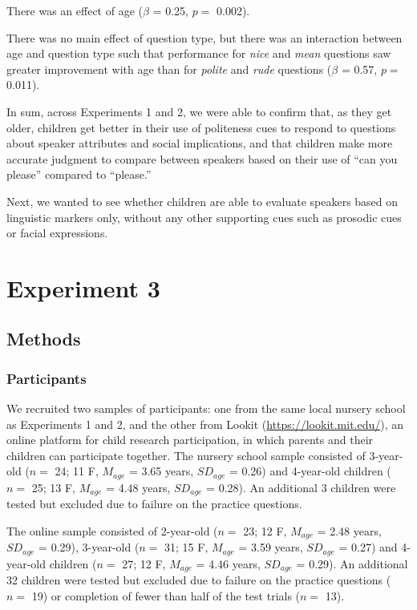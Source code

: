 \documentclass[10pt, letterpaper]{article}
\begin{document}
There was an effect of age (\(\beta\) = 0.25, \(p =\) 0.002).

There was no main effect of question type, but there was an interaction
between age and question type such that performance for \emph{nice} and
\emph{mean} questions saw greater improvement with age than for
\emph{polite} and \emph{rude} questions (\(\beta\) = 0.57, \(p =\)
0.011).

In sum, across Experiments 1 and 2, we were able to confirm that, as
they get older, children get better in their use of politeness cues to
respond to questions about speaker attributes and social implications,
and that children make more accurate judgment to compare between
speakers based on their use of ``can you please'' compared to
``please.''

Next, we wanted to see whether children are able to evaluate speakers
based on linguistic markers only, without any other supporting cues such
as prosodic cues or facial expressions.

\section{Experiment 3}\label{experiment-3}

\subsection{Methods}\label{methods-2}

\subsubsection{Participants}\label{participants-2}

We recruited two samples of participants: one from the same local
nursery school as Experiments 1 and 2, and the other from Lookit
(\url{https://lookit.mit.edu/}), an online platform for child research
participation, in which parents and their children can participate
together. The nursery school sample consisted of 3-year-old (\(n=\) 24;
11 F, \(M_{age}\) = 3.65 years, \(SD_{age}\) = 0.26) and 4-year-old
children (\(n=\) 25; 13 F, \(M_{age}\) = 4.48 years, \(SD_{age}\) =
0.28). An additional 3 children were tested but excluded due to failure
on the practice questions.

The online sample consisted of 2-year-old (\(n=\) 23; 12 F, \(M_{age}\)
= 2.48 years, \(SD_{age}\) = 0.29), 3-year-old (\(n=\) 31; 15 F,
\(M_{age}\) = 3.59 years, \(SD_{age}\) = 0.27) and 4-year-old children
(\(n=\) 27; 12 F, \(M_{age}\) = 4.46 years, \(SD_{age}\) = 0.29). An
additional 32 children were tested but excluded due to failure on the
practice questions (\(n=\) 19) or completion of fewer than half of the
test trials (\(n=\) 13).
\end{document}
